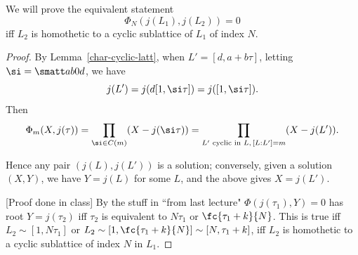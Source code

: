 \begin{thm}
We will prove the equivalent statement
\[
\Phi_N(j(L_1),j(L_2))=0
\]
iff $L_2$ is homothetic to a cyclic sublattice of $L_1$ of index $N$.
\end{thm}
\begin{proof}
By Lemma~\ref{char-cyclic-latt}, when $L'=[d, a+b\tau]$, letting $\si=\smatt ab0d$, we have
\[
j(L')=j(d[1,\si \tau])=j([1,\si\tau]).
\]
Then
\[
\Phi_m(X,j(\tau))=\prod_{\si\in C(m)} (X-j(\si\tau))=\prod_{L'\text{ cyclic in }L, \,[L:L']=m} (X-j(L')).
\]

Hence any pair $(j(L),j(L'))$ is a solution; conversely, given a solution $(X,Y)$, we have $Y=j(L)$ for some $L$, and the above gives $X=j(L')$.

[Proof done in class] By the stuff in ``from last lecture" $\Phi(j(\tau_1),Y)=0$ has root $Y=j(\tau_2)$ iff $\tau_2$ is equivalent to $N\tau_1$ or $\fc{\tau_1+k}{N}$. This is true iff $L_2\sim[1,N\tau_1]$ or $L_2\sim [1,\fc{\tau_1+k}{N}]\sim[N,\tau_1+k]$, iff $L_2$ is homothetic to a cyclic sublattice of index $N$ in $L_1$.
\end{proof}

